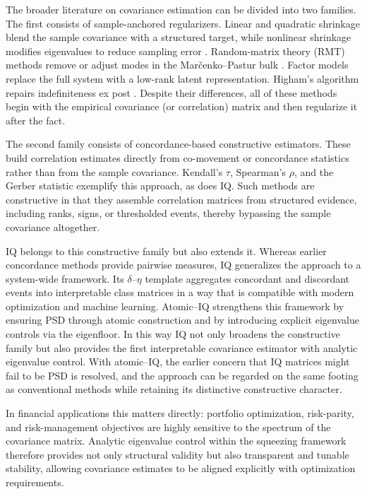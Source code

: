 \documentclass[12pt,letterpaper]{article}
\begin{document}
The broader literature on covariance estimation can be divided into two families. The first consists of sample-anchored regularizers. Linear and quadratic shrinkage blend the sample covariance with a structured target, while nonlinear shrinkage modifies eigenvalues to reduce sampling error \citep{ledoit2004well,ledoit2017,ledoit2022quadratic}. Random-matrix theory (RMT) methods remove or adjust modes in the Mar\v{c}enko--Pastur bulk \citep{laloux1999,bun2017cleaning}. Factor models \citep{chamberlain1983factor,fan2013factor} replace the full system with a low-rank latent representation. Higham’s algorithm repairs indefiniteness ex post \citep{higham2002computing}. Despite their differences, all of these methods begin with the empirical covariance (or correlation) matrix and then regularize it after the fact. 

The second family consists of concordance-based constructive estimators. These build correlation estimates directly from co-movement or concordance statistics rather than from the sample covariance. Kendall’s $\tau$, Spearman’s $\rho$, and the Gerber statistic exemplify this approach, as does IQ. Such methods are constructive in that they assemble correlation matrices from structured evidence, including ranks, signs, or thresholded events, thereby bypassing the sample covariance altogether.

IQ belongs to this constructive family but also extends it. Whereas earlier concordance methods provide pairwise measures, IQ generalizes the approach to a system-wide framework. Its $\delta$--$\eta$ template aggregates concordant and discordant events into interpretable class matrices in a way that is compatible with modern optimization and machine learning. Atomic--IQ strengthens this framework by ensuring PSD through atomic construction and by introducing explicit eigenvalue controls via the eigenfloor. In this way IQ not only broadens the constructive family but also provides the first interpretable covariance estimator with analytic eigenvalue control. With atomic--IQ, the earlier concern that IQ matrices might fail to be PSD is resolved, and the approach can be regarded on the same footing as conventional methods while retaining its distinctive constructive character.

In financial applications this matters directly: portfolio optimization, risk-parity, and risk-management objectives are highly sensitive to the spectrum of the covariance matrix. Analytic eigenvalue control within the squeezing framework therefore provides not only structural validity but also transparent and tunable stability, allowing covariance estimates to be aligned explicitly with optimization requirements.
\end{document}
